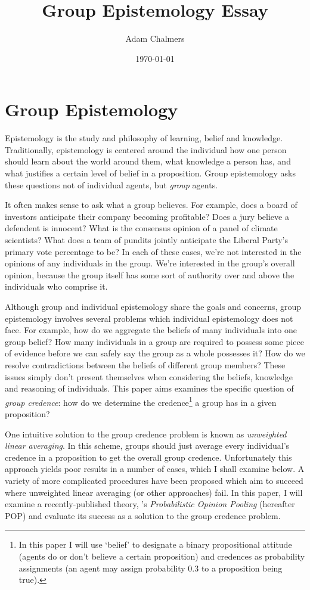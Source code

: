 \documentclass{article}
\title{Group Epistemology Essay}
\author{Adam Chalmers}
\date{\today}
\begin{document}
\frenchspacing
\onehalfspacing
\maketitle


\section{Group Epistemology}

Epistemology is the study and philosophy of learning, belief and knowledge. Traditionally, epistemology is centered around the individual \textemdash{} how one person should learn about the world around them, what knowledge a person has, and what justifies a certain level of belief in a proposition. Group epistemology asks these questions not of individual agents, but \textit{group} agents. 

It often makes sense to ask what a group believes. For example, does a board of investors anticipate their company becoming profitable? Does a jury believe a defendent is innocent? What is the consensus opinion of a panel of climate scientists? What does a team of pundits jointly anticipate the Liberal Party's primary vote percentage to be? In each of these cases, we're not interested in the opinions of any individuals in the group. We're interested in the group's overall opinion, because the group itself has some sort of authority over and above the individuals who comprise it.

Although group and individual epistemology share the goals and concerns, group epistemology involves several problems which individual epistemology does not face. For example, how do we aggregate the beliefs of many individuals into one group belief? How many individuals in a group are required to possess some piece of evidence before we can safely say the group as a whole possesses it? How do we resolve contradictions between the beliefs of different group members? These issues simply don't present themselves when considering the beliefs, knowledge and reasoning of individuals. This paper aims examines the specific question of \textit{group credence}: how do we determine the credence\footnote{In this paper I will use `belief' to designate a binary propositional attitude (agents do or don't believe a certain proposition) and credences as probability assignments (an agent may assign probability 0.3 to a proposition being true).} a group has in a given proposition?

One intuitive solution to the group credence problem is known as \textit{unweighted linear averaging}. In this scheme, groups should just average every individual's credence in a proposition to get the overall group credence. Unfortunately this approach yields poor results in a number of cases, which I shall examine below. A variety of more complicated procedures have been proposed which aim to succeed where unweighted linear averaging (or other approaches) fail. In this paper, I will examine a recently-published theory, \citet{dietrich2013probabilistic}'s \textit{Probabilistic Opinion Pooling} (hereafter POP) and evaluate its success as a solution to the group credence problem.
\end{document}
